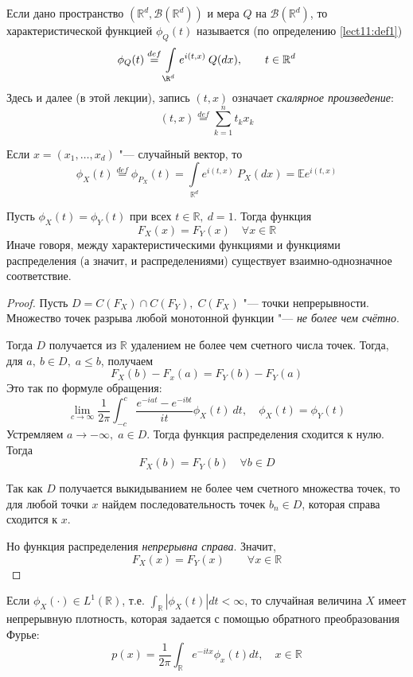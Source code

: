 \documentclass[a4paper,reqno]{amsart}
\begin{document}
Если дано пространство $(\mathbb{R}^d, \mathcal{B}(\mathbb{R}^d))$ и мера $Q$ на $\mathcal{B}(\mathbb{R}^d)$, то характеристической функцией $\phi_Q(t)$ называется (по определению \ref{lect11:def1})
$$\phi_Q(t) \overset{def}{=} \int\limits_{\R^d} e^{i(t,x)} \:Q(dx), \qquad t\in \mathbb{R}^d$$
Здесь и далее (в этой лекции), запись $(t,x)$ означает \emph{скалярное произведение}:
$$(t,x) \overset{def}{=} \sum_{k=1}^n t_kx_k$$
\begin{nb}
    Если $x = (x_1, \ldots, x_d)$ "--- случайный вектор, то
    $$\phi_X(t) \overset{def}{=} \phi_{P_X}(t) = \int\limits_{\mathbb{R}^d} e^{i(t,x)}\:P_X(dx) = \mathbb{E} e^{i(t,x)}$$
\end{nb}
\begin{theorem}[Единственность] \label{lect12:th1}
    Пусть $\phi_X(t) = \phi_Y(t)$ при всех $t \in \mathbb{R},\: d = 1$. Тогда функция $$F_X(x) = F_Y(x)\quad \forall x\in \mathbb{R}$$ Иначе говоря, между характеристическими функциями и функциями распределения (а значит, и распределениями) существует взаимно-однозначное соответствие.
\begin{proof}
    Пусть $D = C(F_X) \cap C(F_Y), \;C(F_X)$ "--- точки непрерывности. Множество точек разрыва любой монотонной функции "--- \emph{не более чем счётно}.

    Тогда $D$ получается из $\mathbb{R}$ удалением не более чем счетного числа точек. Тогда, для $a, \: b \in D,\; a\leqslant b$, получаем
    $$F_X(b) - F_x(a) = F_Y(b) - F_Y(a)$$
    Это так по формуле обращения:
    $$\lim_{c\to \infty} \frac{1}{2\pi} \int_{-c}^c \frac{e^{-iat} - e^{-ibt}}{it} \phi_X(t)\: dt, \quad \phi_X(t) = \phi_Y(t)$$
    Устремляем $a \to -\infty,\; a\in D$. Тогда функция распределения сходится к нулю.
    Тогда $$F_X(b) = F_Y(b) \quad \forall b \in D$$

\parbox[b][1.1cm][t]{0.8\textwidth}{
Так как $D$ получается выкидыванием не более чем счетного множества точек, то для любой точки $x$ найдем последовательность точек $b_n \in D$, которая справа сходится к $x$.
}
\hfill
\parbox[b][1.1cm][t]{0.2\textwidth}{}
    
    Но функция распределения \emph{непрерывна справа}.
    Значит, $$F_X(x) = F_Y(x) \qquad \forall x \in \mathbb{R}$$
\end{proof}
\end{theorem}
\begin{theorem} \label{lect12:th2}
    Если $\phi_X(\cdot) \in L^1(\mathbb{R})$, т.е. $\int_{\mathbb{R}} |\phi_X(t)| dt < \infty$, то случайная величина $X$ имеет непрерывную плотность, которая задается с помощью обратного преобразования Фурье:
    $$p(x) = \frac{1}{2\pi}\int_\mathbb{R} e^{-itx} \phi_x(t) dt,\quad x\in \mathbb{R} $$
\end{theorem}
\end{document}
